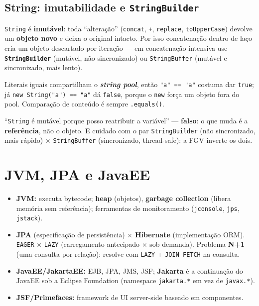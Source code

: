 \subsection{String: imutabilidade e \texttt{StringBuilder}}

\texttt{String} é \textbf{imutável}: toda ``alteração''
(\texttt{concat}, \texttt{+}, \texttt{replace}, \texttt{toUpperCase})
devolve um \textbf{objeto novo} e deixa o original intacto. Por isso
concatenação dentro de laço cria um objeto descartado por iteração --- em
concatenação intensiva use \textbf{\texttt{StringBuilder}} (mutável, não
sincronizado) ou \texttt{StringBuffer} (mutável e sincronizado, mais lento).

Literais iguais compartilham o \textbf{\textit{string pool}}, então
\texttt{"a" == "a"} costuma dar \texttt{true}; já
\texttt{new String("a") == "a"} dá \texttt{false}, porque o \texttt{new}
força um objeto fora do pool. Comparação de conteúdo é sempre
\texttt{.equals()}.

\begin{pegadinha}
``\texttt{String} é mutável porque posso reatribuir a variável'' ---
\textbf{falso}: o que muda é a \textbf{referência}, não o objeto. E cuidado
com o par \texttt{StringBuilder} (não sincronizado, mais rápido) $\times$
\texttt{StringBuffer} (sincronizado, thread-safe): a FGV inverte os dois.
\end{pegadinha}

\section{JVM, JPA e JavaEE}

\begin{itemize}
\item \textbf{JVM:} executa bytecode; \textbf{heap} (objetos),
\textbf{garbage collection} (libera memória sem referência); ferramentas de
monitoramento (\texttt{jconsole}, \texttt{jps}, \texttt{jstack}).
\item \textbf{JPA} (especificação de persistência) $\times$
\textbf{Hibernate} (implementação ORM). \texttt{EAGER} $\times$
\texttt{LAZY} (carregamento antecipado $\times$ sob demanda). Problema
\textbf{N+1} (uma consulta por relação): resolve com \texttt{LAZY} +
\texttt{JOIN FETCH} na consulta.
\item \textbf{JavaEE/JakartaEE:} EJB, JPA, JMS, JSF; \textbf{Jakarta} é a
continuação do JavaEE sob a Eclipse Foundation (namespace \texttt{jakarta.*}
em vez de \texttt{javax.*}).
\item \textbf{JSF/Primefaces:} framework de UI server-side baseado em
componentes.
\end{itemize}

